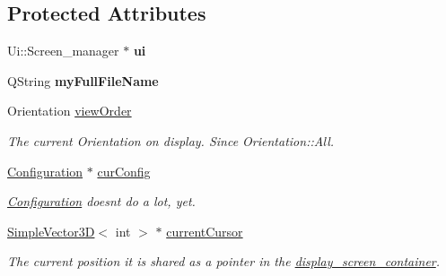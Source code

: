 \subsection*{Protected Attributes}
\begin{DoxyCompactItemize}
\item 
\mbox{\label{classScreen__manager_a08d9ac0f5ff1946873ceafa1c91fd5bf}} 
Ui\+::\+Screen\+\_\+manager $\ast$ {\bfseries ui}
\item 
\mbox{\label{classScreen__manager_aca1b3a8cf4a318e3c6a90c8886389cc6}} 
Q\+String {\bfseries my\+Full\+File\+Name}
\item 
\mbox{\label{classScreen__manager_a0677c1654b984e635d160189de4c77ad}} 
Orientation \mbox{\hyperlink{classScreen__manager_a0677c1654b984e635d160189de4c77ad}{view\+Order}}
\begin{DoxyCompactList}\small\item\em The current Orientation on display. Since Orientation\+::\+All. \end{DoxyCompactList}\item 
\mbox{\label{classScreen__manager_add6a20bb797b0a544aed8b84371a4f24}} 
\mbox{\hyperlink{classConfiguration}{Configuration}} $\ast$ \mbox{\hyperlink{classScreen__manager_add6a20bb797b0a544aed8b84371a4f24}{cur\+Config}}
\begin{DoxyCompactList}\small\item\em \mbox{\hyperlink{classConfiguration}{Configuration}} doesn\textquotesingle{}t do a lot, yet. \end{DoxyCompactList}\item 
\mbox{\label{classScreen__manager_a8b9367dee1bb7f7b76b7c8b7fd219f6c}} 
\mbox{\hyperlink{classViewer_1_1SimpleVector3D}{Simple\+Vector3D}}$<$ int $>$ $\ast$ \mbox{\hyperlink{classScreen__manager_a8b9367dee1bb7f7b76b7c8b7fd219f6c}{current\+Cursor}}
\begin{DoxyCompactList}\small\item\em The current position it is shared as a pointer in the \mbox{\hyperlink{classdisplay__screen__container}{display\+\_\+screen\+\_\+container}}. \end{DoxyCompactList}\item 
\mbox{\label{classScreen__manager_ac1552176fcb2eec1f3f71139933b38b6}} 

\end{DoxyCompactItemize}
